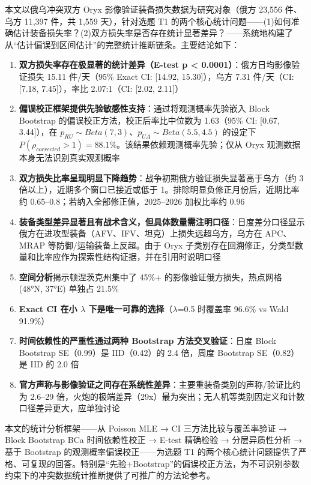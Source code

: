 \documentclass[
  a4paper,
  fontset=none,
]{ctexart}
\providecommand{\tightlist}{%
  \setlength{\itemsep}{0pt}\setlength{\parskip}{0pt}}
\begin{document}
本文以俄乌冲突双方 Oryx 影像验证装备损失数据为研究对象（俄方 23,556
件、乌方 11,397 件，共 1,559 天），针对选题 T1
的两个核心统计问题------(1)如何准确估计装备损失率？(2)双方损失率是否存在统计显著差异？------系统地构建了从``估计偏误到区间估计''的完整统计推断链条。主要结论如下：

\begin{enumerate}
\def\labelenumi{\arabic{enumi}.}
\tightlist
\item
  \textbf{双方损失率存在极显著的统计差异（E-test p \textless{}
  0.0001）}：俄方日均影像验证损失 15.11 件/天（95\% Exact CI: {[}14.92,
  15.30{]}），乌方 7.31 件/天（CI: {[}7.18, 7.45{]}），率比 2.07:1（CI:
  {[}2.02, 2.11{]}）
\item
  \textbf{偏误校正框架提供先验敏感性支持}：通过将观测概率先验嵌入 Block
  Bootstrap 的偏误校正方法，校正后率比中位数为 1.63（95\% CI: {[}0.67,
  3.44{]}），在 \(p_{RU}\sim Beta(7,3)\)、\(p_{UA}\sim Beta(5.5,4.5)\)
  的设定下
  \(P(\rho_{corrected} > 1) = 88.1\%\)。该结果依赖观测概率先验；仅从
  Oryx 观测数据本身无法识别真实观测概率
\item
  \textbf{双方损失比率呈现明显下降趋势}：战争初期俄方验证损失显著高于乌方（约
  3 倍以上），近期多个窗口已接近或低于
  1。排除明显负修正月份后，近期比率约
  0.65--0.8；若纳入全部修正值，2025--2026 加权比率约 0.96
\item
  \textbf{装备类型差异显著且有战术含义，但具体数量需注明口径}：日度差分口径显示俄方在进攻型装备（AFV、IFV、坦克）上损失远超乌方，乌方在
  APC、MRAP 等防御/运输装备上反超。由于 Oryx
  子类别存在回溯修正，分类型数量和比率应作为探索性结构证据，并在引用时说明口径
\item
  \textbf{空间分析}揭示顿涅茨克州集中了 45\%+
  的影像验证俄方损失，热点网格 (48°N, 37°E) 单独占 21.5\%
\item
  \textbf{Exact CI 在小 \(\lambda\) 下是唯一可靠的选择}（\(\lambda\)=0.5 时覆盖率 96.6\% vs
  Wald 91.9\%）
\item
  \textbf{时间依赖性的严重性通过两种 Bootstrap 方法交叉验证}：日度 Block
  Bootstrap SE（0.99）是 IID（0.42）的 2.4 倍，周度 Bootstrap
  SE（0.82）是 IID 的 2.0 倍
\item
  \textbf{官方声称与影像验证之间存在系统性差异}：主要重装备类别的声称/验证比约为
  2.6--29
  倍，火炮的极端差异（29x）最为突出；无人机等类别因定义和计数口径差异更大，应单独讨论
\end{enumerate}

本文的统计分析框架------从 Poisson MLE → CI 三方法比较与覆盖率验证 →
Block Bootstrap BCa 时间依赖性校正 → E-test 精确检验 → 分层异质性分析 →
基于 Bootstrap 的观测概率偏误校正------为选题 T1
的两个核心统计问题提供了严格、可复现的回答。特别是``先验+Bootstrap''的偏误校正方法，为不可识别参数约束下的冲突数据统计推断提供了可推广的方法论参考。
\end{document}
